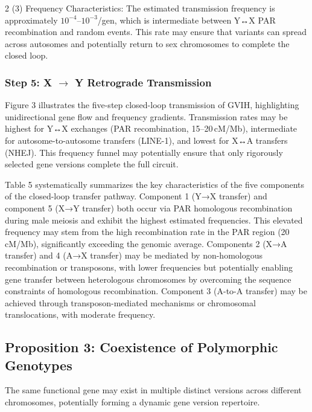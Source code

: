 \documentclass{base}
\begin{document}
\begin{multicols}{2}
(3) Frequency Characteristics: The estimated transmission frequency is approximately $10^{-4}$--$10^{-3}$/gen, which is intermediate between Y↔X PAR recombination and random events. This rate may ensure that variants can spread across autosomes and potentially return to sex chromosomes to complete the closed loop.


\subsubsection{Step 5: X $\rightarrow$ Y Retrograde Transmission}

Figure 3 illustrates the five-step closed-loop transmission of GVIH, highlighting unidirectional gene flow and frequency gradients. Transmission rates may be highest for Y↔X exchanges (PAR recombination, 15–20 cM/Mb), intermediate for autosome-to-autosome transfers (LINE-1), and lowest for X↔A transfers (NHEJ). This frequency funnel may potentially ensure that only rigorously selected gene versions complete the full circuit.


Table 5 systematically summarizes the key characteristics of the five components of the closed-loop transfer pathway. Component 1 (Y→X transfer) and component 5 (X→Y transfer) both occur via PAR homologous recombination during male meiosis and exhibit the highest estimated frequencies. This elevated frequency may stem from the high recombination rate in the PAR region (20 cM/Mb), significantly exceeding the genomic average. Components 2 (X→A transfer) and 4 (A→X transfer) may be mediated by non-homologous recombination or transposons, with lower frequencies but potentially enabling gene transfer between heterologous chromosomes by overcoming the sequence constraints of homologous recombination. Component 3 (A-to-A transfer) may be achieved through transposon-mediated mechanisms or chromosomal translocations, with moderate frequency.



\subsection{Proposition 3: Coexistence of Polymorphic Genotypes}
The same functional gene may exist in multiple distinct versions across different chromosomes, potentially forming a dynamic gene version repertoire. 


\end{multicols}
\end{document}
